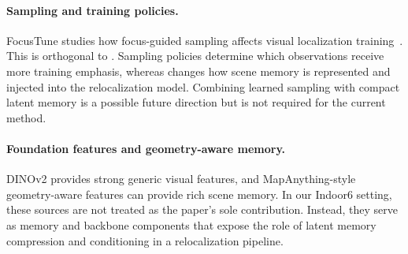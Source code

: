 \paragraph{Sampling and training policies.}
FocusTune studies how focus-guided sampling affects visual localization training~\cite{nguyen2023focustune}. This is orthogonal to \shortmethod{}. Sampling policies determine which observations receive more training emphasis, whereas \shortmethod{} changes how scene memory is represented and injected into the relocalization model. Combining learned sampling with compact latent memory is a possible future direction but is not required for the current method.

\paragraph{Foundation features and geometry-aware memory.}
DINOv2 provides strong generic visual features, and MapAnything-style geometry-aware features can provide rich scene memory. In our Indoor6 setting, these sources are not treated as the paper's sole contribution. Instead, they serve as memory and backbone components that expose the role of latent memory compression and conditioning in a relocalization pipeline.
